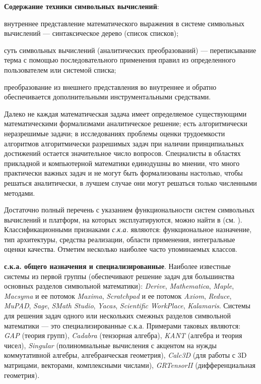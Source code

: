 \textbf{Содержание техники символьных вычислений}:
\begin{textitemize}
	\item внутреннее представление математического выражения в системе символьных вычислений --- синтаксическое дерево (список списков);
	\item суть символьных вычислений (аналитических преобразований) --- переписывание терма с помощью последовательного применения правил из определенного пользователем или системой списка;
	\item преобразование из внешнего представления во внутреннее и обратно обеспечивается дополнительными инструментальными средствами.
\end{textitemize}

Далеко не каждая математическая задача имеет определяемое существующими математическими формализмами аналитическое решение; есть алгоритмически неразрешимые задачи; в исследованиях проблемы оценки трудоемкости алгоритмов алгоритмически разрешимых задач при наличии принципиальных достижений остается значительное число вопросов. Специалисты в областях прикладной и компьютерной математики единодушны во мнении, что много практически важных задач и не могут быть формализованы настолько, чтобы решаться аналитически, в лучшем случае они могут решаться только численными методами.

Достаточно полный перечень с указанием функциональности систем символьных вычислений и платформ, на которых эксплуатируются, можно найти в (см. ). Классификационными признаками \textit{с.к.а.} являются: функциональное назначение, тип архитектуры, средства реализации, области применения, интегральные оценки качества. Отметим несколько наиболее часто упоминаемых классов.

\textbf{с.к.а. общего назначения и специализированные}. Наиболее известные системы из первой группы (обеспечивают решение задач для большинства основных разделов символьной математики): \textit{Derive}, \textit{Mathematica}, \textit{Maple}, \textit{Macsyma} и ее потомок \textit{Maxima}, \textit{Scratchpad} и ее потомок \textit{Axiom}, \textit{Reduce}, \textit{MuPAD}, \textit{Sage}, \textit{SMath Studio}, \textit{Yacas}, \textit{Scientific WorkPlace}, \textit{Kalamaris}. Системы для решения задач одного или нескольких смежных разделов символьной математики --- это специализированные с.к.а. Примерами таковых являются: \textit{GAP} (теория групп), \textit{Cadabra} (тензорная алгебра), \textit{KANT} (алгебра и теория чисел), \textit{Singular} (полиномиальные вычисления с акцентом на нужды коммутативной алгебры, алгебраическая геометрия), \textit{Calc3D} (для работы с 3D матрицами, векторами, комплексными числами), \textit{GRTensorII} (дифференциальная геометрия).


